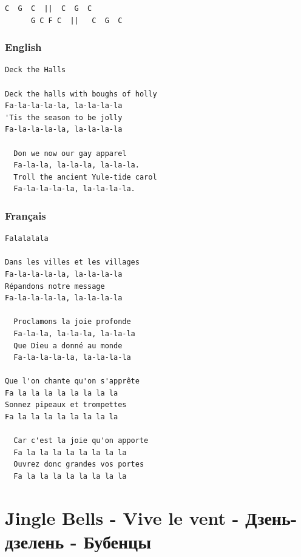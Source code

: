 \documentclass[
]{article}
\begin{document}
\begin{verbatim}
C  G  C  ||  C  G  C 
      G C F C  ||   C  G  C
\end{verbatim}

\hypertarget{english}{%
\subsubsection*{English}\label{english}}

\begin{verbatim}
Deck the Halls

Deck the halls with boughs of holly
Fa-la-la-la-la, la-la-la-la
'Tis the season to be jolly
Fa-la-la-la-la, la-la-la-la

  Don we now our gay apparel
  Fa-la-la, la-la-la, la-la-la.
  Troll the ancient Yule-tide carol
  Fa-la-la-la-la, la-la-la-la.
\end{verbatim}

\hypertarget{franuxe7ais}{%
\subsubsection*{Français}\label{franuxe7ais}}

\begin{verbatim}
Falalalala

Dans les villes et les villages 
Fa-la-la-la-la, la-la-la-la
Répandons notre message 
Fa-la-la-la-la, la-la-la-la

  Proclamons la joie profonde 
  Fa-la-la, la-la-la, la-la-la
  Que Dieu a donné au monde 
  Fa-la-la-la-la, la-la-la-la

Que l'on chante qu'on s'apprête
Fa la la la la la la la la
Sonnez pipeaux et trompettes
Fa la la la la la la la la

  Car c'est la joie qu'on apporte
  Fa la la la la la la la la
  Ouvrez donc grandes vos portes
  Fa la la la la la la la la
\end{verbatim}

\hypertarget{jingle-bells---vive-le-vent---ux434ux437ux435ux43dux44c-ux434ux437ux435ux43bux435ux43dux44c---ux431ux443ux431ux435ux43dux446ux44b}{%
\section{Jingle Bells - Vive le vent - Дзень-дзелень -
Бубенцы}\label{jingle-bells---vive-le-vent---ux434ux437ux435ux43dux44c-ux434ux437ux435ux43bux435ux43dux44c---ux431ux443ux431ux435ux43dux446ux44b}}
\end{document}
